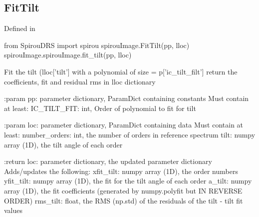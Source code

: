 \begin{minipage}{\textwidth}
\subsection{FitTilt}

Defined in \spirouImage{}

\begin{pythonbox}
from SpirouDRS import spirou
spirouImage.FitTilt(pp, lloc)
spirouImage.spirouImage.fit_tilt(pp, lloc)
\end{pythonbox}

\begin{pythondocstring}
Fit the tilt (lloc['tilt'] with a polynomial of size = p['ic_tilt_filt']
return the coefficients, fit and residual rms in lloc dictionary

:param pp: parameter dictionary, ParamDict containing constants
    Must contain at least:
        IC_TILT_FIT: int, Order of polynomial to fit for tilt

:param loc: parameter dictionary, ParamDict containing data
        Must contain at least:
            number_orders: int, the number of orders in reference spectrum
            tilt: numpy array (1D), the tilt angle of each order

:return loc: parameter dictionary, the updated parameter dictionary
        Adds/updates the following:
            xfit_tilt: numpy array (1D), the order numbers
            yfit_tilt: numpy array (1D), the fit for the tilt angle of each
                       order
            a_tilt: numpy array (1D), the fit coefficients (generated by
                    numpy.polyfit but IN REVERSE ORDER)
            rms_tilt: float, the RMS (np.std) of the residuals of the
                      tilt - tilt fit values
\end{pythondocstring}
\end{minipage}


